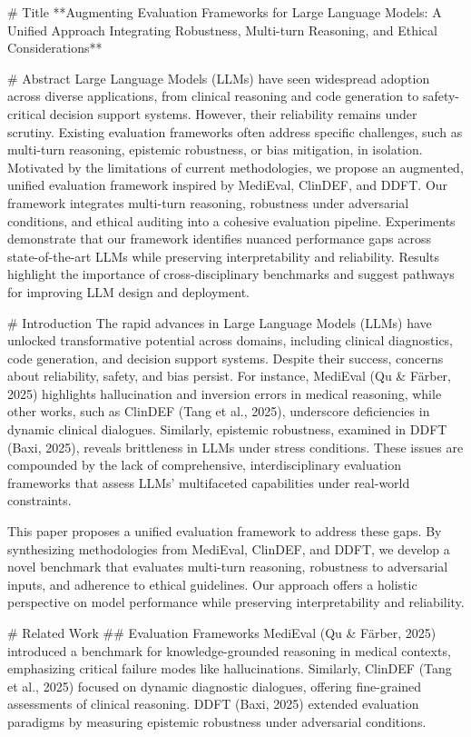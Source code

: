 # Title
**Augmenting Evaluation Frameworks for Large Language Models: A Unified Approach Integrating Robustness, Multi-turn Reasoning, and Ethical Considerations**

# Abstract
Large Language Models (LLMs) have seen widespread adoption across diverse applications, from clinical reasoning and code generation to safety-critical decision support systems. However, their reliability remains under scrutiny. Existing evaluation frameworks often address specific challenges, such as multi-turn reasoning, epistemic robustness, or bias mitigation, in isolation. Motivated by the limitations of current methodologies, we propose an augmented, unified evaluation framework inspired by MediEval, ClinDEF, and DDFT. Our framework integrates multi-turn reasoning, robustness under adversarial conditions, and ethical auditing into a cohesive evaluation pipeline. Experiments demonstrate that our framework identifies nuanced performance gaps across state-of-the-art LLMs while preserving interpretability and reliability. Results highlight the importance of cross-disciplinary benchmarks and suggest pathways for improving LLM design and deployment.

# Introduction
The rapid advances in Large Language Models (LLMs) have unlocked transformative potential across domains, including clinical diagnostics, code generation, and decision support systems. Despite their success, concerns about reliability, safety, and bias persist. For instance, MediEval (Qu & Färber, 2025) highlights hallucination and inversion errors in medical reasoning, while other works, such as ClinDEF (Tang et al., 2025), underscore deficiencies in dynamic clinical dialogues. Similarly, epistemic robustness, examined in DDFT (Baxi, 2025), reveals brittleness in LLMs under stress conditions. These issues are compounded by the lack of comprehensive, interdisciplinary evaluation frameworks that assess LLMs' multifaceted capabilities under real-world constraints.

This paper proposes a unified evaluation framework to address these gaps. By synthesizing methodologies from MediEval, ClinDEF, and DDFT, we develop a novel benchmark that evaluates multi-turn reasoning, robustness to adversarial inputs, and adherence to ethical guidelines. Our approach offers a holistic perspective on model performance while preserving interpretability and reliability.

# Related Work
## Evaluation Frameworks
MediEval (Qu & Färber, 2025) introduced a benchmark for knowledge-grounded reasoning in medical contexts, emphasizing critical failure modes like hallucinations. Similarly, ClinDEF (Tang et al., 2025) focused on dynamic diagnostic dialogues, offering fine-grained assessments of clinical reasoning. DDFT (Baxi, 2025) extended evaluation paradigms by measuring epistemic robustness under adversarial conditions.

